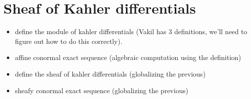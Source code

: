 \documentclass[a4paper]{article}
\newtheorem{prop}[thm]{Proposition}
\newcommand{\Spec}{\operatorname{Spec}}
\begin{document}
%
%			
%
%

\section{Sheaf of Kahler differentials}

\begin{itemize}
	\item define the module of kahler differentials
		(Vakil has 3 definitions, we'll need to figure out 
		how to do this correctly).
    \item affine conormal exact sequence
		(algebraic computation using the definition)
	\item define the sheaf of kahler differentials
		(globalizing the previous)
	\item sheafy conormal exact sequence
		(globalizing the previous)
\end{itemize}
\end{document}
